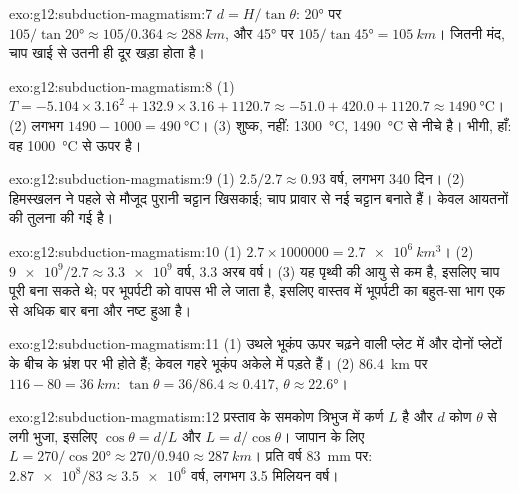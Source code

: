 \begin{solution}{exo:g12:subduction-magmatism:7}
$d = H/\tan\theta$: \ang{20} पर $105/\tan\ang{20} \approx 105/0.364 \approx
\qty{288}{km}$, और \ang{45} पर $105/\tan\ang{45} = \qty{105}{km}$।
 जितनी मंद, चाप खाई से उतनी ही दूर खड़ा होता है।
\end{solution}

\begin{solution}{exo:g12:subduction-magmatism:8}
(1) $T = -5.104 \times 3.16^2 + 132.9 \times 3.16 + 1120.7 \approx -51.0 +
420.0 + 1120.7 \approx \qty{1490}{\celsius}$। (2) लगभग $1490 - 1000 =
\qty{490}{\celsius}$। (3) शुष्क, नहीं: \qty{1300}{\celsius},
\qty{1490}{\celsius} से नीचे है। भीगी, हाँ: वह \qty{1000}{\celsius} से ऊपर है।
\end{solution}

\begin{solution}{exo:g12:subduction-magmatism:9}
(1) $2.5/2.7 \approx 0.93$ वर्ष, लगभग 340 दिन। (2) हिमस्खलन ने पहले से मौजूद
पुरानी चट्टान खिसकाई; चाप प्रावार से नई चट्टान बनाते हैं। केवल
आयतनों की तुलना की गई है।
\end{solution}

\begin{solution}{exo:g12:subduction-magmatism:10}
(1) $2.7 \times \num{1000000} = \qty{2.7e6}{km^3}$। (2) $\num{9e9}/2.7
\approx \num{3.3e9}$ वर्ष, 3.3 अरब वर्ष। (3) यह पृथ्वी की आयु से कम है,
इसलिए चाप पूरी  बना सकते थे; पर
 भूपर्पटी को वापस भी ले जाता है, इसलिए वास्तव में भूपर्पटी का बहुत-सा भाग एक से अधिक बार
बना और नष्ट हुआ है।
\end{solution}

\begin{solution}{exo:g12:subduction-magmatism:11}
(1) उथले भूकंप ऊपर चढ़ने वाली प्लेट में और दोनों प्लेटों के बीच के भ्रंश पर
भी होते हैं; केवल गहरे भूकंप अकेले  में पड़ते हैं।
(2) \qty{86.4}{km} पर $116 - 80 = \qty{36}{km}$: $\tan\theta = 36/86.4
\approx 0.417$, $\theta \approx \ang{22.6}$।
\end{solution}

\begin{solution}{exo:g12:subduction-magmatism:12}
प्रस्ताव के समकोण त्रिभुज में  कर्ण $L$ है
और $d$ कोण $\theta$ से लगी भुजा, इसलिए $\cos\theta = d/L$ और $L =
d/\cos\theta$। जापान के लिए $L = 270/\cos\ang{20} \approx 270/0.940 \approx
\qty{287}{km}$। प्रति वर्ष \qty{83}{mm} पर: $\num{2.87e8}/83 \approx \num{3.5e6}$
वर्ष, लगभग 3.5 मिलियन वर्ष।
\end{solution}

